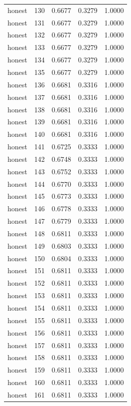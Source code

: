 \begin{tabular}{lrrrr}
honest & 130 & 0.6677 & 0.3279 & 1.0000 \\
honest & 131 & 0.6677 & 0.3279 & 1.0000 \\
honest & 132 & 0.6677 & 0.3279 & 1.0000 \\
honest & 133 & 0.6677 & 0.3279 & 1.0000 \\
honest & 134 & 0.6677 & 0.3279 & 1.0000 \\
honest & 135 & 0.6677 & 0.3279 & 1.0000 \\
honest & 136 & 0.6681 & 0.3316 & 1.0000 \\
honest & 137 & 0.6681 & 0.3316 & 1.0000 \\
honest & 138 & 0.6681 & 0.3316 & 1.0000 \\
honest & 139 & 0.6681 & 0.3316 & 1.0000 \\
honest & 140 & 0.6681 & 0.3316 & 1.0000 \\
honest & 141 & 0.6725 & 0.3333 & 1.0000 \\
honest & 142 & 0.6748 & 0.3333 & 1.0000 \\
honest & 143 & 0.6752 & 0.3333 & 1.0000 \\
honest & 144 & 0.6770 & 0.3333 & 1.0000 \\
honest & 145 & 0.6773 & 0.3333 & 1.0000 \\
honest & 146 & 0.6778 & 0.3333 & 1.0000 \\
honest & 147 & 0.6779 & 0.3333 & 1.0000 \\
honest & 148 & 0.6811 & 0.3333 & 1.0000 \\
honest & 149 & 0.6803 & 0.3333 & 1.0000 \\
honest & 150 & 0.6804 & 0.3333 & 1.0000 \\
honest & 151 & 0.6811 & 0.3333 & 1.0000 \\
honest & 152 & 0.6811 & 0.3333 & 1.0000 \\
honest & 153 & 0.6811 & 0.3333 & 1.0000 \\
honest & 154 & 0.6811 & 0.3333 & 1.0000 \\
honest & 155 & 0.6811 & 0.3333 & 1.0000 \\
honest & 156 & 0.6811 & 0.3333 & 1.0000 \\
honest & 157 & 0.6811 & 0.3333 & 1.0000 \\
honest & 158 & 0.6811 & 0.3333 & 1.0000 \\
honest & 159 & 0.6811 & 0.3333 & 1.0000 \\
honest & 160 & 0.6811 & 0.3333 & 1.0000 \\
honest & 161 & 0.6811 & 0.3333 & 1.0000 \\

\end{tabular}
